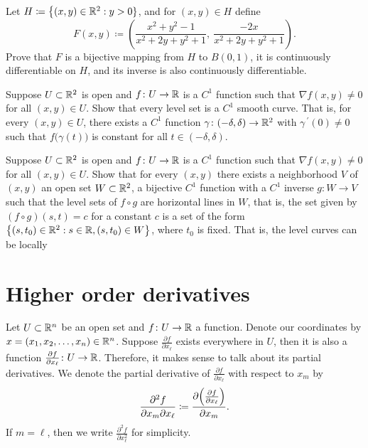 \begin{exercise}
Let $H \coloneqq \bigl\{ (x,y) \in {\mathbb{R}}^2 : y > 0 \}$, and for $(x,y) \in H$
define
\begin{equation*}
F(x,y) \coloneqq \left(
\frac{x^2+y^2-1}{x^2+2y+y^2+1}
,~
\frac{-2x}{x^2+2y+y^2+1}
\right) .
\end{equation*}
Prove that $F$ is a bijective mapping from $H$ to $B(0,1)$, it is
continuously differentiable on $H$, and its inverse is also continuously
differentiable.
\end{exercise}

\begin{exercise}
Suppose $U \subset {\mathbb{R}}^2$ is open and $f \colon U \to {\mathbb{R}}$ is
a $C^1$ function such
that $\nabla f(x,y) \not= 0$ for all $(x,y) \in U$.  Show that every
level set is a $C^1$ smooth curve.  That is,
for every
$(x,y) \in U$, there exists a $C^1$ function $\gamma \colon (-\delta,\delta)
\to {\mathbb{R}}^2$ with $\gamma^{\:\prime}(0) \not= 0$ such that
$f\bigl(\gamma(t)\bigr)$ is constant for all $t \in (-\delta,\delta)$.
\end{exercise}

\begin{exercise}
Suppose $U \subset {\mathbb{R}}^2$ is open and $f \colon U \to {\mathbb{R}}$ is
a $C^1$ function such
that $\nabla f(x,y) \not= 0$ for all $(x,y) \in U$.
Show that for every $(x,y)$ there exists a neighborhood $V$ of $(x,y)$
an open set $W \subset {\mathbb{R}}^2$, a bijective $C^1$ function with
a $C^1$ inverse $g \colon W \to V$ such that
the level sets of $f \circ g$ are horizontal lines in $W$, that is,
the set given by $(f \circ g) (s,t) = c$ for a constant $c$ is a set of the form
$\bigl\{ (s,t_0) \in {\mathbb{R}}^2 : s \in {\mathbb{R}}, (s,t_0) \in W \bigr\}$, where $t_0$ is fixed.
That is, the level curves can be locally 
\end{exercise}


\sectionnewpage
\section{Higher order derivatives}
\label{sec:mvhighordders}


Let $U \subset {\mathbb{R}}^n$ be an open set and $f \colon U \to {\mathbb{R}}$ a function.
Denote our coordinates by $x = (x_1,x_2,\ldots,x_n) \in {\mathbb{R}}^n$.
Suppose $\frac{\partial f}{\partial x_{\ell}}$ exists everywhere in $U$,
then it is also a function $\frac{\partial f}{\partial x_{\ell}}
\colon U \to {\mathbb{R}}$.  Therefore, it makes sense to talk about its partial
derivatives.  We denote 
the partial derivative of $\frac{\partial f}{\partial x_{\ell}}$ with respect to
$x_m$ by
\begin{equation*}
\frac{\partial^2 f}{\partial x_m \partial x_{\ell}}
\coloneqq
\frac{\partial \Bigl( \frac{\partial f}{\partial x_{\ell}} \Bigr)}{\partial x_m} .
\end{equation*}
If $m={\ell}$, then we write 
$\frac{\partial^2 f}{\partial x_{\ell}^2}$ for simplicity.

